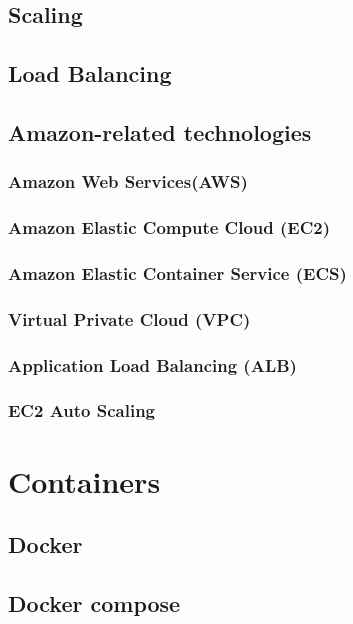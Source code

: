 \subsection{Scaling}

\subsection{Load Balancing}

\subsection{Amazon-related technologies}
\subsubsection{Amazon Web Services(AWS)}

\subsubsection{Amazon Elastic Compute Cloud (EC2)}

\subsubsection{Amazon Elastic Container Service (ECS)}

\subsubsection{Virtual Private Cloud (VPC)}

\subsubsection{Application Load Balancing (ALB)}

\subsubsection{EC2 Auto Scaling}

\section{Containers}

\subsection{Docker}

\subsection{Docker compose}
